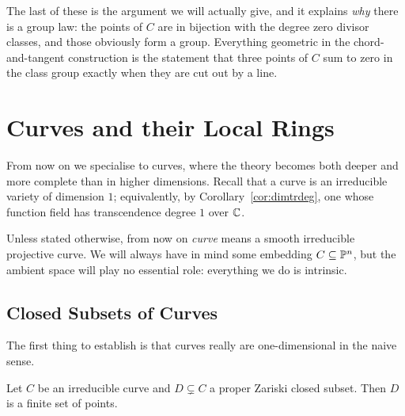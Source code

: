 \documentclass[a4paper]{scrartcl}
\begin{document}
The last of these is the argument we will actually give, and it explains \emph{why} there is a group law: the points of $C$ are in bijection with the degree zero divisor classes, and those obviously form a group. Everything geometric in the chord-and-tangent construction is the statement that three points of $C$ sum to zero in the class group exactly when they are cut out by a line.

\section{Curves and their Local Rings}

From now on we specialise to curves, where the theory becomes both deeper and more complete than in higher dimensions. Recall that a curve is an irreducible variety of dimension $1$; equivalently, by Corollary~\ref{cor:dimtrdeg}, one whose function field has transcendence degree $1$ over $\mathbb{C}$.

\begin{notation}
	Unless stated otherwise, from now on \emph{curve} means a smooth irreducible projective curve. We will always have in mind some embedding $C \subseteq \mathbb{P}^n$, but the ambient space will play no essential role: everything we do is intrinsic.
\end{notation}

\subsection{Closed Subsets of Curves}

The first thing to establish is that curves really are one-dimensional in the naive sense.

\begin{proposition}\label{prop:closedfinite}
	Let $C$ be an irreducible curve and $D \subsetneq C$ a proper Zariski closed subset. Then $D$ is a finite set of points.
\end{proposition}
\end{document}
